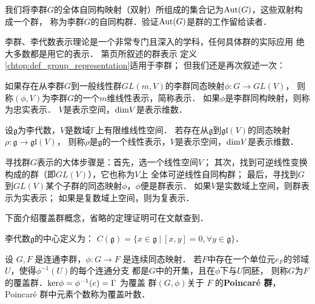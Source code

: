我们将李群$G$的全体自同构映射（双射）所组成的集合记为${\rm Aut}(G)$，这些双射构成一个群，
称为李群$G$的{\heiti 自同构群}．验证${\rm Aut}(G)$是群的工作留给读者．



李群、李代数表示理论是一个非常专门且深入的学科，任何具体群的实际应用
绝大多数都是用它的表示．
第\pageref{chtop:def_group_representation}页所叙述的群表示
定义\ref{chtop:def_group_representation}适用于李群；
但我们还是再次叙述一次：
\begin{definition}
    如果存在从李群$G$到一般线性群$GL(m,V)$的李群同态映射$\phi:G\to GL(V)$，
    则称$(\phi,V)$为李群$G$的一个$m$维{\heiti 线性表示}，简称{\heiti 表示}．
    如果$\phi$是李群同构映射，则称为{\heiti  忠实表示}．
    $V$是表示空间，${\rm dim}V$是表示{\heiti 维数}．
\end{definition}

\begin{definition}
    设$\mathfrak{g}$为李代数，$V$是数域$\mathbb{F}$上有限维线性空间．
    若存在从$\mathfrak{g}$到$\mathfrak{gl}(V)$的同态映射$\rho : \mathfrak{g}\to \mathfrak{gl}(V)$，
    则称$\rho$是$\mathfrak{g}$的一个{\heiti 线性表示}，$V$是表示空间，${\rm dim}V$是表示{\heiti 维数}．
\end{definition}


寻找群$G$表示的大体步骤是：首先，选一个线性空间$V$；
其次，找到可逆线性变换构成的群（即$GL(V)$），它也称为$V$上
全体可逆线性自同构群；
最后，寻找到$G$到$GL(V)$某个子群的同态映射$\phi$，$\phi$便是群表示．
如果$V$是实数域上空间，则群表示为{\heiti 实表示}；
如果是复数域上空间，则为{\heiti 复表示}．




下面介绍覆盖群概念，省略的定理证明可在文献\parencite[p.231--240]{xuyc-2001}查到．
\begin{definition}
    李代数$\mathfrak{g}$的{\heiti 中心}定义为：
    $C(\mathfrak{g})=\{x\in \mathfrak{g}\ |\ [x,y]=0,\forall y\in\mathfrak{g}\}$．
\end{definition}

 

\begin{definition}
    设 $G, F$ 是连通李群，$\phi: G \rightarrow F$ 是连续同态映射．
    若$F$中存在一个单位元$e_F$的邻域$U$，使得$\phi^{-1}(U)$的每个连通分支
    都是$G$中的开集，且在$\phi$下与$U$同胚，
    则称$G$为$F$的{\heiti 覆盖群}．${\rm ker} \phi=\phi^{-1}(e)=\Gamma$ 为覆盖
    群$(G, \phi)$关于 $F$ 的{\heiti\bfseries Poincar\'e 群}，Poincar\'e 群中元素个数称为{\heiti 覆盖叶数}．
\end{definition}

